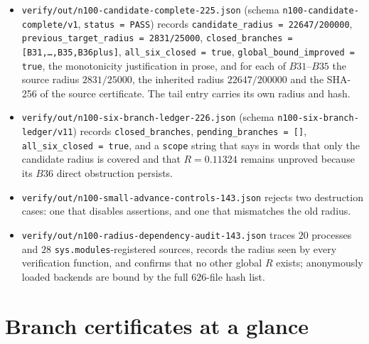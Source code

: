 \begin{itemize}[leftmargin=1.4em,itemsep=3pt]
\item \texttt{verify/\allowbreak{}out/\allowbreak{}n100-\allowbreak{}candidate-\allowbreak{}complete-\allowbreak{}225.json} (schema
\texttt{n100-\allowbreak{}candidate-\allowbreak{}complete/\allowbreak{}v1}, \texttt{status = PASS}) records
\texttt{candidate\_\allowbreak{}radius = 22647/\allowbreak{}200000}, \texttt{previous\_\allowbreak{}target\_\allowbreak{}radius = 2831/\allowbreak{}25000},
\texttt{closed\_\allowbreak{}branches = [B31,\dots,B35,B36plus]}, \texttt{all\_\allowbreak{}six\_\allowbreak{}closed = true},
\texttt{global\_\allowbreak{}bound\_\allowbreak{}improved = true}, the monotonicity justification in prose, and for each of
$B31$--$B35$ the source radius $2831/25000$, the inherited radius $22647/200000$ and the SHA-256 of
the source certificate. The tail entry carries its own radius and hash.
\item \texttt{verify/\allowbreak{}out/\allowbreak{}n100-\allowbreak{}six-\allowbreak{}branch-\allowbreak{}ledger-\allowbreak{}226.json} (schema
\texttt{n100-\allowbreak{}six-\allowbreak{}branch-\allowbreak{}ledger/\allowbreak{}v11}) records \texttt{closed\_\allowbreak{}branches}, \texttt{pending\_\allowbreak{}branches =
[]}, \texttt{all\_\allowbreak{}six\_\allowbreak{}closed = true}, and a \texttt{scope} string that says in words that only the
candidate radius is covered and that $R=0.11324$ remains unproved because its $B36$ direct
obstruction persists.
\item {\footnotesize\texttt{verify/\allowbreak{}out/\allowbreak{}n100-\allowbreak{}small-\allowbreak{}advance-\allowbreak{}controls-\allowbreak{}143.json}} rejects two destruction cases: one
that disables assertions, and one that mismatches the old radius.
\item {\footnotesize\texttt{verify/\allowbreak{}out/\allowbreak{}n100-\allowbreak{}radius-\allowbreak{}dependency-\allowbreak{}audit-\allowbreak{}143.json}} traces $20$ processes and $28$
\texttt{sys.modules}-registered sources, records the radius seen by every verification function, and
confirms that no other global $R$ exists; anonymously loaded backends are bound by the full
$626$-file hash list.
\end{itemize}

\section{Branch certificates at a glance}

